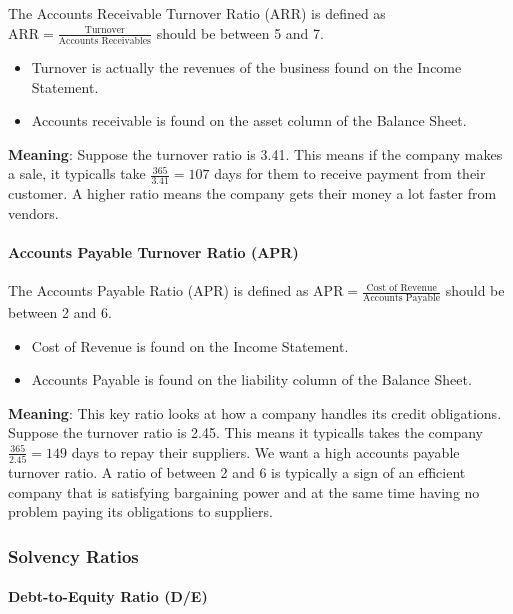 The Accounts Receivable Turnover Ratio (ARR) is defined as
$\text{ARR} = \frac{\text{Turnover}}{\text{Accounts Receivables}}$ should be
between 5 and 7.
\begin{itemize}
    \item Turnover is actually the revenues of the business found on the Income Statement.
    \item Accounts receivable is found on the asset column of the Balance Sheet.
\end{itemize}
\textbf{Meaning}: Suppose the turnover ratio is 3.41. This means if the company
makes a sale, it typicalls take $\frac{\text{365}}{3.41} = 107$ days for them to
receive payment from their customer. A higher ratio means the company gets their
money a lot faster from vendors.

\paragraph{Accounts Payable Turnover Ratio (APR)}

The Accounts Payable Ratio (APR) is defined as
$\text{APR} = \frac{\text{Cost of Revenue}}{\text{Accounts Payable}}$ should be
between 2 and 6.
\begin{itemize}
    \item Cost of Revenue is found on the Income Statement.
    \item Accounts Payable is found on the liability column of the Balance Sheet.
\end{itemize}
\textbf{Meaning}: This key ratio looks at how a company handles its credit
obligations. Suppose the turnover ratio is 2.45. This means it typicalls takes
the company $\frac{\text{365}}{2.45} = 149$ days to repay their suppliers. We want
a high accounts payable turnover ratio. A ratio of between 2 and 6 is typically
a sign of an efficient company that is satisfying bargaining power and at the same
time having no problem paying its obligations to suppliers.

\subsubsection{Solvency Ratios}

\paragraph{Debt-to-Equity Ratio (D/E)}

